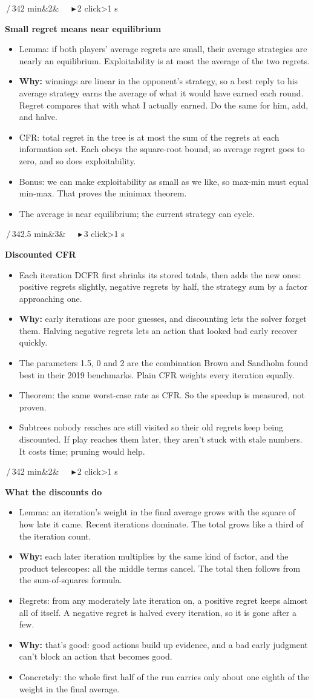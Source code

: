 \documentclass{article}
\newcommand{\slide}[4]{\clearpage
  \noindent\colorbox{bar}{\parbox{\dimexpr\linewidth-2\fboxsep}{\color{white}\fontsize{13}{15}\selectfont
  \textbf{\fontsize{21}{23}\selectfont #1}\,/\,34\hfill #3\ifx&#4&\else\ \ \ \textcolor{ck!40!white}{\ensuremath{\blacktriangleright}}\,#4 click\ifnum#4>1 s\fi\fi\\[2pt]
  \raggedright\textbf{\fontsize{15}{17.5}\selectfont #2}}}\par\vspace{5pt}
  \fontsize{15}{17.8}\selectfont\raggedright}
\newcommand{\pt}{\item[\textbullet]}
\newcommand{\ck}{\item[\textcolor{ck}{\ensuremath{\blacktriangleright}}]}
\newcommand{\why}{\textcolor{why}{\textbf{Why:}} }
\begin{document}
\slide{7}{Small regret means near equilibrium}{2 min}{2}
\begin{itemize}
\pt Lemma: if both players' average regrets are small, their average strategies are nearly an equilibrium. Exploitability is at most the average of the two regrets.
\ck \why winnings are linear in the opponent's strategy, so a best reply to his average strategy earns the average of what it would have earned each round. Regret compares that with what I actually earned. Do the same for him, add, and halve.
\ck CFR: total regret in the tree is at most the sum of the regrets at each information set. Each obeys the square-root bound, so average regret goes to zero, and so does exploitability.
\pt Bonus: we can make exploitability as small as we like, so max-min must equal min-max. That proves the minimax theorem.
\pt The average is near equilibrium; the current strategy can cycle.
\end{itemize}

\slide{8}{Discounted CFR}{2.5 min}{3}
\begin{itemize}
\pt Each iteration DCFR first shrinks its stored totals, then adds the new ones: positive regrets slightly, negative regrets by half, the strategy sum by a factor approaching one.
\pt \why early iterations are poor guesses, and discounting lets the solver forget them. Halving negative regrets lets an action that looked bad early recover quickly.
\ck The parameters 1.5, 0 and 2 are the combination Brown and Sandholm found best in their 2019 benchmarks. Plain CFR weights every iteration equally.
\ck Theorem: the same worst-case rate as CFR. So the speedup is measured, not proven.
\ck Subtrees nobody reaches are still visited so their old regrets keep being discounted. If play reaches them later, they aren't stuck with stale numbers. It costs time; pruning would help.
\end{itemize}

\slide{9}{What the discounts do}{2 min}{2}
\begin{itemize}
\pt Lemma: an iteration's weight in the final average grows with the square of how late it came. Recent iterations dominate. The total grows like a third of the iteration count.
\ck \why each later iteration multiplies by the same kind of factor, and the product telescopes: all the middle terms cancel. The total then follows from the sum-of-squares formula.
\ck Regrets: from any moderately late iteration on, a positive regret keeps almost all of itself. A negative regret is halved every iteration, so it is gone after a few.
\pt \why that's good: good actions build up evidence, and a bad early judgment can't block an action that becomes good.
\pt Concretely: the whole first half of the run carries only about one eighth of the weight in the final average.
\end{itemize}
\end{document}
